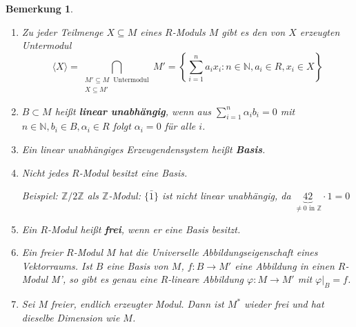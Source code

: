 \documentclass[a4paper,12pt]{scrbook}
\theoremstyle{break}
\newtheorem{Bem}[Def]{Bemerkung}
\theoremstyle{nonumberbreak}
\theoremstyle{nonumberplain}
\newcommand{\emp}[1]{\textbf{\emph{#1}}}
\begin{document}
\begin{Bem}
  \begin{enumerate}
    \item Zu jeder Teilmenge $X \subseteq M$ eines $R$-Moduls $M$ gibt es den von
          $X$ erzeugten Untermodul $$\langle X \rangle = \displaystyle 
          \bigcap_{\substack{M' \subseteq M\; \text{ Untermodul} \\ X \subseteq M'}} M' = \left\{
          \sum_{i=1}^n a_i x_i: n \in \mathbb{N}, a_i \in R, x_i \in X \right\}$$
    \item $B \subset M$ heißt \emp{linear unabhängig},
          wenn aus $\displaystyle \sum_{i=1}^n \alpha_i b_i = 0$ mit $n \in
          \mathbb{N}, b_i \in B, \alpha_i \in R$ folgt $\alpha_i = 0$ für alle
          $i$.
    \item Ein linear unabhängiges Erzeugendensystem heißt
          \emp{Basis}.
    \item Nicht jedes $R$-Modul besitzt eine Basis.

          Beispiel: $\mathbb{Z}/2\mathbb{Z}$ als $\mathbb{Z}$-Modul: $\{\bar{1}\}$
          ist nicht linear unabhängig, da $\underbrace{42}_{\not= 0 \text{ in } \mathbb{Z}} \cdot 1 = 0$
    \item Ein $R$-Modul heißt \emp{frei}, wenn er eine
          Basis besitzt.
    \item Ein freier $R$-Modul $M$ hat die Universelle Abbildungseigenschaft eines Vektorraums. Ist $B$ eine
          Basis von $M$, $f: B \to M'$ eine Abbildung in einen $R$-Modul M', so
          gibt es genau eine $R$-lineare Abbildung $\varphi: M \to M'$ mit
          $\varphi|_B = f$.
    \item Sei $M$ freier, endlich erzeugter Modul. Dann ist $M^*$ wieder frei und hat dieselbe
          Dimension wie $M$.
  \end{enumerate}
\end{Bem}
\end{document}
